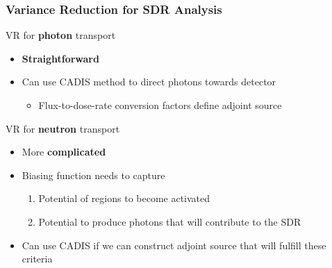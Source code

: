 \documentclass{beamer}
\begin{document}
\begin{frame}
\frametitle{Variance Reduction for SDR Analysis}
		\begin{block}{VR for \textbf{photon} transport}
  \begin{itemize}
  \item{\textbf{Straightforward}}
  \item{Can use CADIS method to direct photons towards detector}
    \begin{itemize}
    \item{Flux-to-dose-rate conversion factors define adjoint source}
    \end{itemize}
  \end{itemize}
	\end{block}
		\begin{block}{VR for \textbf{neutron} transport}
    \begin{itemize}
    \item{More \textbf{complicated}}
    \item{Biasing function needs to capture}
      \begin{enumerate}
        \item{Potential of regions to become activated}
        \item{Potential to produce photons that will contribute to the SDR}
      \end{enumerate}
    \item{Can use CADIS if we can construct adjoint source that will fulfill
	    these criteria}
    \end{itemize}
\end{block}
\end{frame}
\end{document}
